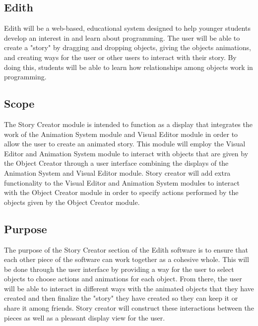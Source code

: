 \documentclass[12pt]{article}
\begin{document}
	\subsection{Edith}
	Edith will be a web-based, educational system designed to help younger students develop an interest in and learn about programming. The user will be able to create a "story" by dragging and dropping objects, giving the objects animations, and creating ways for the user or other users to interact with their story. By doing this, students will be able to learn how relationships among objects work in programming.
	\subsection{Scope}
	The Story Creator module is intended to function as a display that integrates the work of the Animation System module and Visual Editor module in order to allow the user to create an animated story.  This module will employ the Visual Editor and Animation System module to interact with objects that are given by the Object Creator through a user interface combining the displays of the Animation System and Visual Editor module.  Story creator will add extra functionality to the Visual Editor and Animation System modules to interact with the Object Creator module in order to specify actions performed by the objects given by the Object Creator module.\
	\subsection{Purpose}
	The purpose of the Story Creator section of the Edith software is to ensure that each other piece of the software can work together as a cohesive whole. This will be done through the user interface by providing a way for the user to select objects to choose actions and animations for each object. From there, the user will be able to interact in different ways with the animated objects that they have created and then finalize the "story" they have created so they can keep it or share it among friends. Story creator will construct these interactions between the pieces as well as a pleasant display view for the user.
	
	
\end{document}
